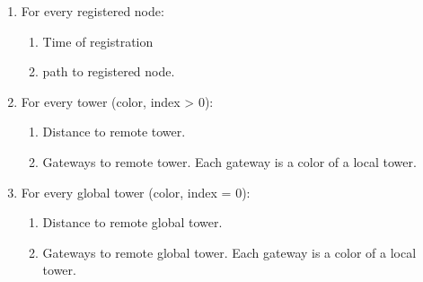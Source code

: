 \documentclass{amsart}
\theoremstyle{definition}
\theoremstyle{remark}
\numberwithin{equation}{section}
\begin{document}
\begin{enumerate}
  \item For every registered node:
    \begin{enumerate}
      \item Time of registration
      \item path to registered node.
    \end{enumerate}
  \item For every tower (color, index > 0):
    \begin{enumerate}
      \item Distance to remote tower.
      \item Gateways to remote tower. Each gateway is a color of a local tower.
    \end{enumerate}
  \item For every global tower (color, index = 0):
    \begin{enumerate}
      \item Distance to remote global tower.
      \item Gateways to remote global tower. Each gateway is a color of a local tower.
    \end{enumerate}

\end{enumerate}




\end{document}
